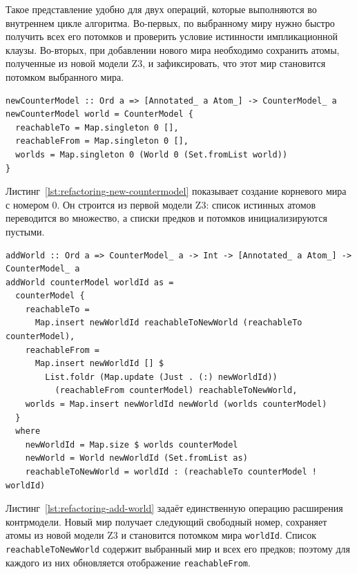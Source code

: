 \documentclass[14pt, russian]{scrartcl}
\begin{document}
Такое представление удобно для двух операций, которые выполняются во внутреннем
цикле алгоритма. Во-первых, по выбранному миру нужно быстро получить всех его
потомков и проверить условие истинности импликационной клаузы. Во-вторых, при
добавлении нового мира необходимо сохранить атомы, полученные из новой модели
Z3, и зафиксировать, что этот мир становится потомком выбранного мира.

\begin{listing}[!htb]
\caption{Создание начальной контрмодели \texttt{newCounterModel}}
\label{lst:refactoring-new-countermodel}
\begin{verbatim}
newCounterModel :: Ord a => [Annotated_ a Atom_] -> CounterModel_ a
newCounterModel world = CounterModel {
  reachableTo = Map.singleton 0 [],
  reachableFrom = Map.singleton 0 [],
  worlds = Map.singleton 0 (World 0 (Set.fromList world))
}
\end{verbatim}
\end{listing}

Листинг~\ref{lst:refactoring-new-countermodel} показывает создание корневого
мира с номером $0$. Он строится из первой модели Z3: список истинных атомов
переводится во множество, а списки предков и потомков инициализируются пустыми.

\begin{listing}[!htb]
\caption{Добавление нового мира в контрмодель \texttt{addWorld}}
\label{lst:refactoring-add-world}
\begin{verbatim}
addWorld :: Ord a => CounterModel_ a -> Int -> [Annotated_ a Atom_] -> CounterModel_ a
addWorld counterModel worldId as = 
  counterModel {
    reachableTo =
      Map.insert newWorldId reachableToNewWorld (reachableTo counterModel),
    reachableFrom =
      Map.insert newWorldId [] $
        List.foldr (Map.update (Just . (:) newWorldId))
          (reachableFrom counterModel) reachableToNewWorld,
    worlds = Map.insert newWorldId newWorld (worlds counterModel)
  }
  where
    newWorldId = Map.size $ worlds counterModel
    newWorld = World newWorldId (Set.fromList as)
    reachableToNewWorld = worldId : (reachableTo counterModel ! worldId)
\end{verbatim}
\end{listing}

Листинг~\ref{lst:refactoring-add-world} задаёт единственную операцию расширения
контрмодели. Новый мир получает следующий свободный номер, сохраняет атомы из
новой модели Z3 и становится потомком мира \texttt{worldId}. Список
\texttt{reachableToNewWorld} содержит выбранный мир и всех его предков; поэтому
для каждого из них обновляется отображение \texttt{reachableFrom}.
\end{document}
